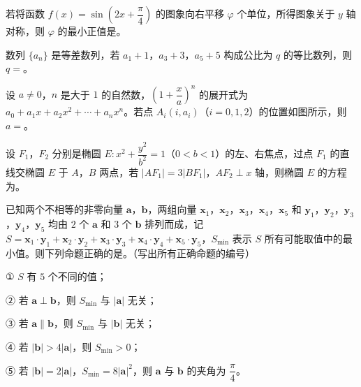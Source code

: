 \begin{question}
若将函数 $f(x)=\sin\left(2x+\dfrac\pi4\right)$ 的图象向右平移 $\varphi$ 个单位，所得图象关于 $y$ 轴对称，则 $\varphi$ 的最小正值是\gkblank{}。

\end{question}
\begin{question}
数列 $\{a_n\}$ 是等差数列，若 $a_1+1$，$a_3+3$，$a_5+5$ 构成公比为 $q$ 的等比数列，则 $q=$\gkblank{}。

\Needspace{0.4\textheight}
\end{question}
\begin{question}
设 $a\neq0$，$n$ 是大于 $1$ 的自然数，$\left(1+\dfrac xa\right)^n$ 的展开式为 $a_0+a_1x+a_2x^2+\cdots+a_nx^n$。若点 $A_i(i,a_i)$（$i=0,1,2$）的位置如图所示，则 $a=$\gkblank{}。
\nopagebreak[4]
\begin{center}\end{center}
\nopagebreak[4]
\end{question}
\begin{question}
设 $F_1$，$F_2$ 分别是椭圆 $E:x^2+\dfrac{y^2}{b^2}=1$（$0<b<1$）的左、右焦点，过点 $F_1$ 的直线交椭圆 $E$ 于 $A$，$B$ 两点，若 $|AF_1|=3|BF_1|$，$AF_2\perp x$ 轴，则椭圆 $E$ 的方程为\gkblank{}。

\end{question}
\begin{question}
已知两个不相等的非零向量 $\boldsymbol a$，$\boldsymbol b$，两组向量 $\boldsymbol x_1$，$\boldsymbol x_2$，$\boldsymbol x_3$，$\boldsymbol x_4$，$\boldsymbol x_5$ 和 $\boldsymbol y_1$，$\boldsymbol y_2$，$\boldsymbol y_3$，$\boldsymbol y_4$，$\boldsymbol y_5$ 均由 $2$ 个 $\boldsymbol a$ 和 $3$ 个 $\boldsymbol b$ 排列而成，记 $S=\boldsymbol x_1\cdot\boldsymbol y_1+\boldsymbol x_2\cdot\boldsymbol y_2+\boldsymbol x_3\cdot\boldsymbol y_3+\boldsymbol x_4\cdot\boldsymbol y_4+\boldsymbol x_5\cdot\boldsymbol y_5$，$S_{\min}$ 表示 $S$ 所有可能取值中的最小值。则下列命题正确的是\gkblank{}。（写出所有正确命题的编号）

① $S$ 有 $5$ 个不同的值；

② 若 $\boldsymbol a\perp\boldsymbol b$，则 $S_{\min}$ 与 $|\boldsymbol a|$ 无关；

③ 若 $\boldsymbol a\parallel\boldsymbol b$，则 $S_{\min}$ 与 $|\boldsymbol b|$ 无关；

④ 若 $|\boldsymbol b|>4|\boldsymbol a|$，则 $S_{\min}>0$；

⑤ 若 $|\boldsymbol b|=2|\boldsymbol a|$，$S_{\min}=8|\boldsymbol a|^2$，则 $\boldsymbol a$ 与 $\boldsymbol b$ 的夹角为 $\dfrac\pi4$。

\end{question}

